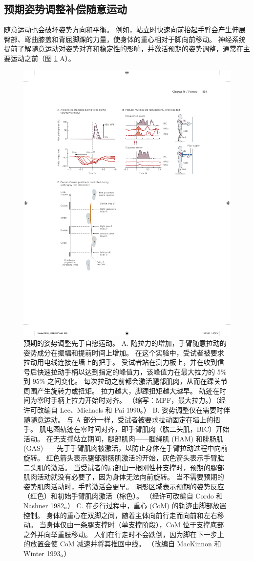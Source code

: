 \subsection{预期姿势调整补偿随意运动}
随意运动也会破坏姿势方向和平衡。 例如，站立时快速向前抬起手臂会产生伸展臀部、弯曲膝盖和背屈脚踝的力量，使身体的重心相对于脚向前移动。 
神经系统提前了解随意运动对姿势对齐和稳定性的影响，并激活预期的姿势调整，通常在主要运动之前（图 \ref{fig:36_8} A）。

\begin{figure}[htbp]
	\centering
	\includegraphics[width=0.85\linewidth]{chap36/fig_36_8}
	\caption{预期的姿势调整先于自愿运动。 A. 随拉力的增加，手臂随意拉动的姿势成分在振幅和提前时间上增加。 在这个实验中，受试者被要求拉动用电线连接在墙上的把手。 受试者站在测力板上，并在收到信号后快速拉动手柄以达到指定的峰值力，该峰值力在最大拉力的 5\% 到 95\% 之间变化。 每次拉动之前都会激活腿部肌肉，从而在踝关节周围产生旋转力或扭矩。 拉力越大，脚踝扭矩越大越早。 轨迹在时间为零时手柄上拉力开始时对齐。 （缩写：MPF，最大拉力。）（经许可改编自 Lee、Michaels 和 Pai 1990。） B. 姿势调整仅在需要时伴随随意运动。 与 A 部分一样，受试者被要求拉动固定在墙上的把手。 肌电图轨迹在零时间对齐，即手臂肌肉（肱二头肌，BIC）开始活动。 在无支撑站立期间，腿部肌肉——腘绳肌 (HAM) 和腓肠肌 (GAS)——先于手臂肌肉被激活，以防止身体在手臂拉动过程中向前旋转。 红色箭头表示腿部腓肠肌激活的开始，灰色箭头表示手臂肱二头肌的激活。 当受试者的肩部由一根刚性杆支撑时，预期的腿部肌肉活动就没有必要了，因为身体无法向前旋转。 当不需要预期的姿势肌肉活动时，手臂激活会更早。 阴影区域表示预期的姿势反应（红色）和初始手臂肌肉激活（棕色）。 （经许可改编自 Cordo 和 Nashner 1982。） C. 在步行过程中，重心 (CoM) 的轨迹由脚部放置控制。 身体的重心在双脚之间，随着主体向前行走而向前和左右移动。 当身体仅由一条腿支撑时（单支撑阶段），CoM 位于支撑底部之外并向举重肢移动。 人们在行走时不会跌倒，因为脚在下一步上的放置会使 CoM 减速并将其推回中线。 （改编自 MacKinnon 和 Winter 1993。）}
	\label{fig:36_8}
\end{figure}

